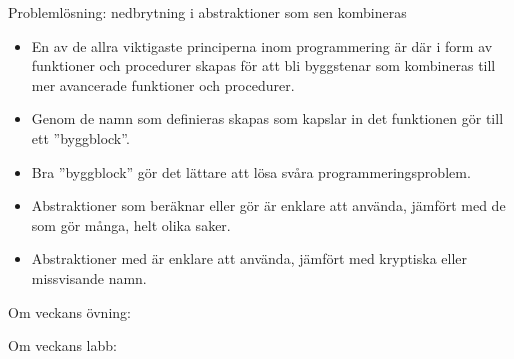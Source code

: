 \begin{Slide}{Problemlösning: nedbrytning i abstraktioner som sen kombineras}\SlideFontSmall
\begin{itemize}
\item En av de allra viktigaste principerna inom programmering är  där   i form av funktioner och procedurer skapas för att bli byggstenar som kombineras till mer avancerade funktioner och procedurer.

\item Genom de namn som definieras skapas  som kapslar in det funktionen gör till ett ''byggblock''.

\item Bra ''byggblock'' gör det lättare att lösa svåra programmeringsproblem.

\item Abstraktioner som beräknar eller gör  är enklare att använda, jämfört med de som gör många, helt olika saker.

\item Abstraktioner med  är enklare att använda, jämfört med kryptiska eller missvisande namn.
\end{itemize}

\end{Slide}

\ifkompendium\else

\begin{SlideExtra}{Om veckans övning: }\SlideFontSmall

\begin{itemize}

\end{itemize}

\end{SlideExtra}

\begin{SlideExtra}{Om veckans labb: }
\begin{itemize}

\end{itemize}
\end{SlideExtra}

\fi

